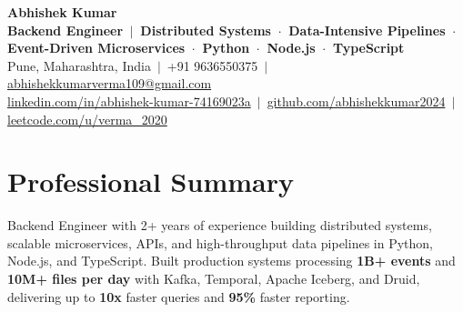 \documentclass[a4paper,11pt]{article}
\begin{document}
\begin{center}
    {\LARGE\bfseries Abhishek Kumar} \\ \vspace{3pt}
    {\color{navy}\bfseries\small Backend Engineer \,$|$\, Distributed Systems \,$\cdot$\, Data-Intensive Pipelines \,$\cdot$\, Event-Driven Microservices \,$\cdot$\, Python \,$\cdot$\, Node.js \,$\cdot$\, TypeScript} \\ \vspace{3pt}
    \small Pune, Maharashtra, India \,$|$\, +91 9636550375 \,$|$\,
    \href{mailto:abhishekkumarverma109@gmail.com}{abhishekkumarverma109@gmail.com} \\ \vspace{1pt}
    \small
    \href{https://www.linkedin.com/in/abhishek-kumar-74169023a/}{linkedin.com/in/abhishek-kumar-74169023a} \,$|$\,
    \href{https://github.com/abhishekkumar2024}{github.com/abhishekkumar2024} \,$|$\,
    \href{https://leetcode.com/u/verma_2020/}{leetcode.com/u/verma\_2020}
\end{center}

\section{Professional Summary}
\small{Backend Engineer with 2+ years of experience building distributed systems, scalable microservices, APIs, and high-throughput data pipelines in Python, Node.js, and TypeScript. Built production systems processing \textbf{1B+ events} and \textbf{10M+ files per day} with Kafka, Temporal, Apache Iceberg, and Druid, delivering up to \textbf{10x} faster queries and \textbf{95\%} faster reporting.}

\end{document}
